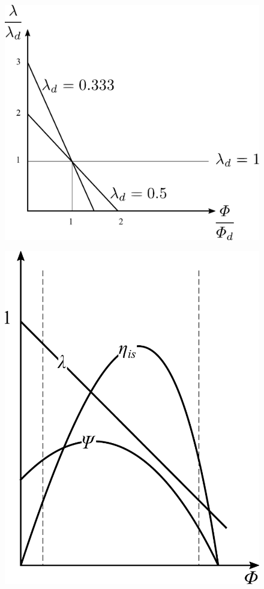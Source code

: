 \begin{figure}
\centering
\begin{minipage}{.5\textwidth}
  \centering
  \includegraphics[width=.9\linewidth]{fig/LambdaPhiChart.pdf}
  \label{fig:LambdaPhiChart}
\end{minipage}%
\begin{minipage}{.5\textwidth}
  \centering
  \includegraphics[width=.9\linewidth]{fig/CarattReal.pdf}
  \label{fig:CarattReal}
\end{minipage}
\end{figure}
